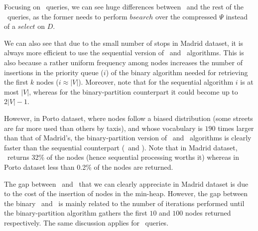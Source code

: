 

	Focusing on \Stk\ queries, we can see huge differences between \Stks\  
	and the rest of the \Stk\ queries, as the former needs to perform {$ bsearch$} over the compressed $\Psi$
	instead of a $select$ on $D$. 

	We can also see that due to the small number of stops in Madrid dataset, it is always more efficient 
	to use the sequential version of \Stks\ and \Stk\ algorithms. This is also because a rather uniform frequency among nodes 
	increases the number of insertions in the priority queue ($i$) of the binary algorithm
	needed for retrieving the first $k$ nodes ($i \approx |V|$). Moreover, note that for the sequential algorithm 
	$i$ is  at most $|V|$, whereas for the binary-partition counterpart it could become up to $2|V|-1$.


	However, in Porto dataset, where nodes follow a biased distribution (some streets are far more used than others
	by taxis), and whose vocabulary 
	is $190$ times larger than that of Madrid's, the binary-partition version of \Stks\ and \Stk\ algorithms is clearly
	faster than the sequential counterpart (\Stkseq\ and \Stksseq).
	Note that in Madrid dataset, \Stcien\ returns 32\% of the nodes (hence sequential processing worths it) 
	whereas in Porto dataset less than 0.2\% of the nodes are returned. 

	The gap between \Stdiezseq\ and \Stcienseq\ that we can clearly appreciate in Madrid dataset 
	is due to the cost of the insertion of nodes in the min-heap. However, the gap between 
	the binary \Stdiez\ and \Stcien\ 
	is mainly related to the number of iterations performed until the binary-partition algorithm gathers the first
	$10$ and $100$ {nodes}  returned respectively. The same discussion applies for \Stks\ queries.






